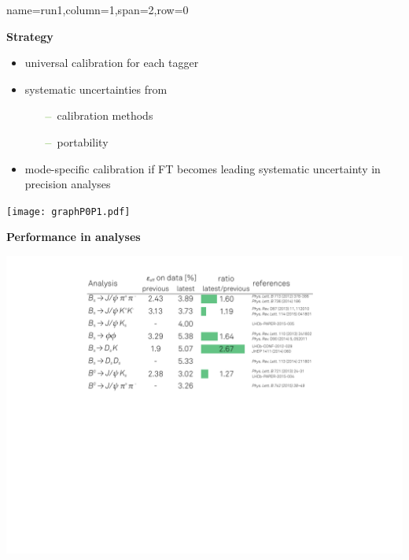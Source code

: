           {name=run1,column=1,span=2,row=0}
{
\begin{minipage}{0.474\boxwidth}
\textbf{Strategy}
\begin{itemize}
\setlength\itemsep{0.01em}
\vspace{-0.3em}
\item universal calibration for each tagger
\item systematic uncertainties from
\begin{itemize}
\setlength\itemsep{0.01em}
\setlength{\itemindent}{-.11in}
\vspace{-0.4em}
\item[${\color{tu_gruen}-}$] calibration methods
\item[${\color{tu_gruen}-}$] portability 
\end{itemize}
\vspace{-0.4em}
\item mode-specific calibration if FT becomes leading systematic uncertainty in precision analyses
\end{itemize}
\vspace{-0.9em}
\begin{center}
\texttt{[image: graphP0P1.pdf]}
\end{center}
\end{minipage}
\vspace{0.6em}
\hfill
\begin{minipage}{0.474\boxwidth}
\vspace{-1.15em}
\textbf{Performance in analyses}
\begin{center}
\includegraphics[width=1.00\textwidth]{figures/table_improvement.pdf}

\end{center}
\end{minipage}}

